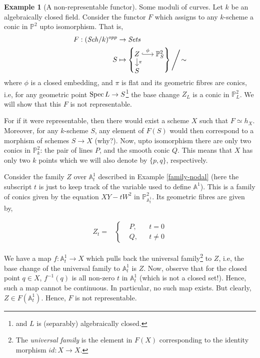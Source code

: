 \documentclass[11pt]{amsart}
\newcommand{\Spec}{{\rm Spec \,}}
\newcommand{\A}{{\mathbb A}}
\renewcommand{\P}{{\mathbb P}}
\theoremstyle{definition}
\newtheorem{example}[theorem]{Example}
\begin{document}
\begin{example}[A non-representable functor] Some moduli of curves. Let $k$ be an algebraically closed field. Consider the functor $F$ which assigns to any $k$-scheme a conic in $\P^2$ upto isomorphism. That is, 
	\begin{align*}
	F: (\mathit{Sch}/k)^{opp} & \rightarrow \mathit{Sets}\\
	S & \mapsto \left\{
	\begin{tikzcd}[cramped, row sep =2ex, column sep=4ex ,ampersand replacement=\&]
	Z\arrow[r,hook,"\phi"]\arrow[d,"\pi"] \& \P_S^2\\
	S
	\end{tikzcd}\right\} \Bigg/\!\sim
	\end{align*}
	where $\phi$ is a closed embedding, and $\pi$ is flat and its geometric fibres are conics, i.e, for any geometric point $\Spec L\rightarrow S$\footnote{and $L$ is (separably) algebraically closed.} the base change $Z_L$ is a conic in $\P_L^2$. We will show that this $F$ is not representable.
	
	For if it were representable, then there would exist a scheme $X$ such that $F\simeq h_X$. Moreover, for any $k$-scheme $S$, any element of $F(S)$ would then correspond to a morphism of schemes $S\rightarrow X$ (why?). Now, upto isomorphism there are only two conics in $\P_k^2$: the pair of lines $P$, and the smooth conic $Q$. This means that $X$ has only two $k$ points which we will also denote by $\{p,q\}$, respectively.
	
	Consider the family $Z$ over $\A_t^1$ described in Example \ref{family-nodal} (here the subscript $t$ is just to keep track of the variable used to define $\A^1$). This is a family of conics given by the equation $XY-tW^2$ in $\P_{\A_t^1}^2$. Its geometric fibres are given by,
	\begin{center}
		\begin{align*}
		Z_t = &\left\{
		\begin{aligned}
		& P,  && t=0\\
		& Q,  && t\neq 0
		\end{aligned}\right.
		\end{align*}
	\end{center}
	We have a map $f:\A_t^1\rightarrow X$ which pulls back the universal family\footnote{The \textit{universal family} is the element in $F(X)$ corresponding to the identity morphism $id: X\rightarrow X$.} to $Z$, i.e, the base change of the universal family to $\A_t^1$ is $Z$. Now, observe that for the closed point $q\in X$, $f^{-1}(q)$ is all non-zero $t$ in $\A_t^1$ (which is not a closed set!). Hence, such a map cannot be continuous. In particular, no such map exists. But clearly, $Z\in F(\A_t^1)$. Hence, $F$ is not representable.
\end{example}
\end{document}
